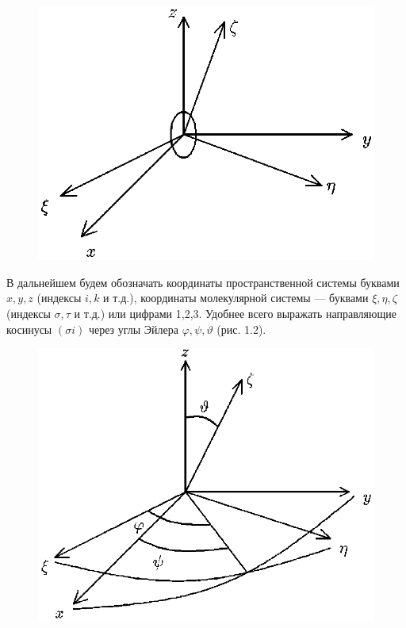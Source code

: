 \begin{figure}[tbp]
\centerline{\hbox{\includegraphics[scale=0.7]{Ris/ris_eps/ris1_01.eps}}}

\end{figure}

В дальнейшем будем обозначать координаты пространственной системы
буквами $x,y,z$ (индексы $i,k$ и т.д.), координаты молекулярной
системы --- буквами $\xi,\eta,\zeta$ (индексы $\sigma,\tau$ и
т.д.) или цифрами 1,2,3. Удобнее всего выражать направляющие
косинусы $(\sigma i)$ через углы Эйлера $\varphi,\psi,\vartheta$
(рис. 1.2).\vskip -2mm

\begin{figure}[tbp]
\centerline{\hbox{\includegraphics[scale=0.7]{Ris/ris_eps/ris1_02.eps}}}

\end{figure}
 
